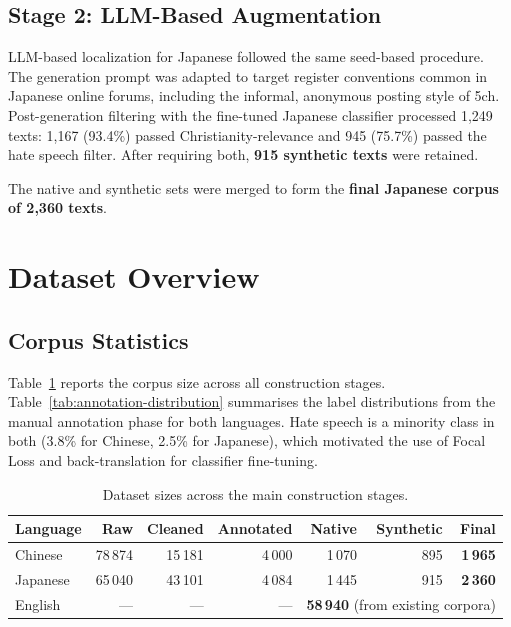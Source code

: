 \documentclass[../CLthesis.tex]{subfiles}
\begin{document}
\subsection{Stage 2: LLM-Based Augmentation}
\label{subsec:ja-aug}

LLM-based localization for Japanese followed the same seed-based procedure. The generation prompt was adapted to target register conventions common in Japanese online forums, including the informal, anonymous posting style of 5ch. Post-generation filtering with the fine-tuned Japanese classifier processed 1,249 texts: 1,167 (93.4\%) passed Christianity-relevance and 945 (75.7\%) passed the hate speech filter. After requiring both, \textbf{915 synthetic texts} were retained.

The native and synthetic sets were merged to form the \textbf{final Japanese corpus of 2,360 texts}.


\section{Dataset Overview}
\label{sec:data-stats}

\subsection{Corpus Statistics}

Table~\ref{tab:dataset-summary} reports the corpus size across all construction stages. Table~\ref{tab:annotation-distribution} summarises the label distributions from the manual annotation phase for both languages. Hate speech is a minority class in both (3.8\% for Chinese, 2.5\% for Japanese), which motivated the use of Focal Loss and back-translation for classifier fine-tuning.

\begin{table}[t]
\centering
\small
\begin{tabular}{@{}lrrrrrr@{}}
\toprule
Language & Raw & Cleaned & Annotated & Native & Synthetic & \textbf{Final} \\
\midrule
Chinese  & 78\,874 & 15\,181 & 4\,000 & 1\,070 & 895 & \textbf{1\,965} \\
Japanese & 65\,040 & 43\,101 & 4\,084 & 1\,445 & 915 & \textbf{2\,360} \\
English  & ---     & ---     & ---    & \multicolumn{3}{c}{\textbf{58\,940} (from existing corpora)} \\
\bottomrule
\end{tabular}
\caption{Dataset sizes across the main construction stages.}
\label{tab:dataset-summary}
\end{table}
\end{document}

